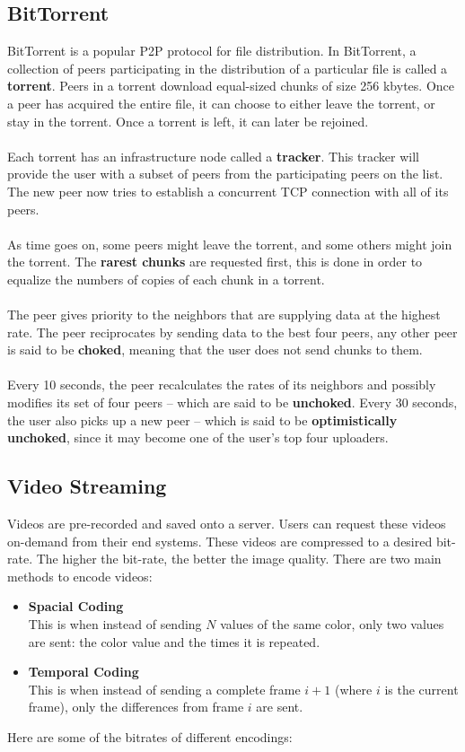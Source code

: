 \documentclass{article}
\begin{document}
\subsection{BitTorrent}
BitTorrent is a popular P2P protocol for file distribution. In BitTorrent, a collection of peers participating in the distribution of a particular file is called a \textbf{torrent}. Peers in a torrent download equal-sized chunks of size 256 kbytes. Once a peer has acquired the entire file, it can choose to either leave the torrent, or stay in the torrent. Once a torrent is left, it can later be rejoined. \\ \\
Each torrent has an infrastructure node called a \textbf{tracker}. This tracker will provide the user with a subset of peers from the participating peers on the list. The new peer now tries to establish a concurrent TCP connection with all of its peers. \\ \\
As time goes on, some peers might leave the torrent, and some others might join the torrent. The \textbf{rarest chunks} are requested first, this is done in order to equalize the numbers of copies of each chunk in a torrent. \\ \\
The peer gives priority to the neighbors that are supplying data at the highest rate. The peer reciprocates by sending data to the best four peers, any other peer is said to be \textbf{choked}, meaning that the user does not send chunks to them. \\ \\
Every 10 seconds, the peer recalculates the rates of its neighbors and possibly modifies its set of four peers -- which are said to be \textbf{unchoked}. Every 30 seconds, the user also picks up a new peer -- which is said to be \textbf{optimistically unchoked}, since it may become one of the user's top four uploaders.

\subsection{Video Streaming}
Videos are pre-recorded and saved onto a server. Users can request these videos on-demand from their end systems. These videos are compressed to a desired bit-rate. The higher the bit-rate, the better the image quality. There are two main methods to encode videos:

\begin{itemize}
	\item \textbf{Spacial Coding}
	\vspace{.2cm} \\
	This is when instead of sending $N$ values of the same color, only two values are sent: the color value and the times it is repeated.
	
	\item \textbf{Temporal Coding}
	\vspace{.2cm} \\
	This is when instead of sending a complete frame $i+1$ (where $i$ is the current frame), only the differences from frame $i$ are sent.
\end{itemize}
Here are some of the bitrates of different encodings:
\end{document}
